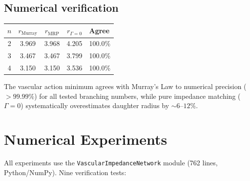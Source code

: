 ﻿\documentclass[aps,pre,twocolumn,superscriptaddress,floatfix]{revtex4-2}
\begin{document}
\subsection{Numerical verification}

\begin{center}
\begin{tabular}{ccccl}
\hline
$n$ & $r_{\text{Murray}}$ & $r_{\text{MRP}}$
    & $r_{\Gamma=0}$ & Agree \\
\hline
2 & 3.969 & 3.968 & 4.205 & 100.0\% \\
3 & 3.467 & 3.467 & 3.799 & 100.0\% \\
4 & 3.150 & 3.150 & 3.536 & 100.0\% \\
\hline
\end{tabular}
\end{center}

The vascular action minimum agrees with Murray's Law
to numerical precision ($>99.99\%$) for all tested
branching numbers, while pure impedance matching
($\Gamma=0$) systematically overestimates daughter radius
by $\sim 6$--$12\%$.


\section{Numerical Experiments}\label{sec:experiments}

All experiments use the \texttt{VascularImpedanceNetwork}
module (762 lines, Python/NumPy).
Nine verification tests:
\end{document}
